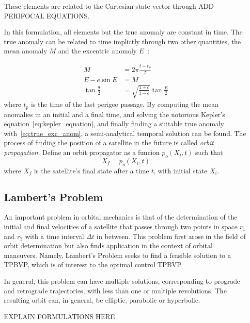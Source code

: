 These elements are related to the Cartesian state vector through ADD PERIFOCAL EQUATIONS.

In this formulation, all elements but the true anomaly are constant in time. The true anomaly can be related to time implictly through two other quantities, the mean anomaly \(M\) and the excentric anomaly \(E\)~\cite{curtis2015orbital}:

\begin{align} 
        M &= 2\pi \frac{t - t_p}{T} \\
        E - e \sin{E} &= M \label{eq:kepler_equation}\\
        \tan{\frac{\theta}{2}} &= \sqrt{\frac{1+e}{1-e}} \tan{\frac{E}{2}} \label{eq:true_exc_anom}
\end{align}
where \(t_p\) is the time of the last perigee passage. By computing the mean anomalies in an initial and a final time, and solving the notorious Kepler's equation~\eqref{eq:kepler_equation}, and finally finding a suitable true anomaly with~\eqref{eq:true_exc_anom}, a semi-analytical temporal solution can be found. The process of finding the position of a satellite in the future is called \textit{orbit propagation}. Define an orbit propagator as a funcion \(p_o(X_i, t)\) such that
\begin{equation} \label{eq:orbit_propagator}
    X_f = p_o(X_i, t)
\end{equation}
where \(X_f\) is the satellite's final state after a time \(t\), with initial state \(X_i\).

\subsection{Lambert's Problem}

An important problem in orbital mechanics is that of the determination of the initial and final velocities of a satellite that passes through two points in space \(r_1\) and \(r_2\) with a time interval \(\Delta t\) in between. This problem first arose in the field of orbit determination but also finds application in the context of orbital maneuvers. Namely, Lambert's Problem seeks to find a feasible solution to a TPBVP, which is of interest to the optimal control TPBVP.

In general, this problem can have multiple solutions, corresponding to prograde and retrograde trajectories, with less than one or multiple revolutions. The resulting orbit can, in general, be elliptic, parabolic or hyperbolic. 

EXPLAIN FORMULATIONS HERE

